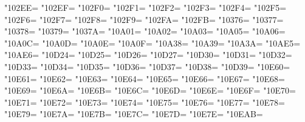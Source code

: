 \XeTeXcharclass"102EE=\KclassNum
\XeTeXcharclass"102EF=\KclassNum
\XeTeXcharclass"102F0=\KclassNum
\XeTeXcharclass"102F1=\KclassNum
\XeTeXcharclass"102F2=\KclassNum
\XeTeXcharclass"102F3=\KclassNum
\XeTeXcharclass"102F4=\KclassNum
\XeTeXcharclass"102F5=\KclassNum
\XeTeXcharclass"102F6=\KclassNum
\XeTeXcharclass"102F7=\KclassNum
\XeTeXcharclass"102F8=\KclassNum
\XeTeXcharclass"102F9=\KclassNum
\XeTeXcharclass"102FA=\KclassNum
\XeTeXcharclass"102FB=\KclassNum
\XeTeXcharclass"10376=\KclassNum
\XeTeXcharclass"10377=\KclassNum
\XeTeXcharclass"10378=\KclassNum
\XeTeXcharclass"10379=\KclassNum
\XeTeXcharclass"1037A=\KclassNum
\XeTeXcharclass"10A01=\KclassNum
\XeTeXcharclass"10A02=\KclassNum
\XeTeXcharclass"10A03=\KclassNum
\XeTeXcharclass"10A05=\KclassNum
\XeTeXcharclass"10A06=\KclassNum
\XeTeXcharclass"10A0C=\KclassNum
\XeTeXcharclass"10A0D=\KclassNum
\XeTeXcharclass"10A0E=\KclassNum
\XeTeXcharclass"10A0F=\KclassNum
\XeTeXcharclass"10A38=\KclassNum
\XeTeXcharclass"10A39=\KclassNum
\XeTeXcharclass"10A3A=\KclassNum
\XeTeXcharclass"10AE5=\KclassNum
\XeTeXcharclass"10AE6=\KclassNum
\XeTeXcharclass"10D24=\KclassNum
\XeTeXcharclass"10D25=\KclassNum
\XeTeXcharclass"10D26=\KclassNum
\XeTeXcharclass"10D27=\KclassNum
\XeTeXcharclass"10D30=\KclassNum
\XeTeXcharclass"10D31=\KclassNum
\XeTeXcharclass"10D32=\KclassNum
\XeTeXcharclass"10D33=\KclassNum
\XeTeXcharclass"10D34=\KclassNum
\XeTeXcharclass"10D35=\KclassNum
\XeTeXcharclass"10D36=\KclassNum
\XeTeXcharclass"10D37=\KclassNum
\XeTeXcharclass"10D38=\KclassNum
\XeTeXcharclass"10D39=\KclassNum
\XeTeXcharclass"10E60=\KclassNum
\XeTeXcharclass"10E61=\KclassNum
\XeTeXcharclass"10E62=\KclassNum
\XeTeXcharclass"10E63=\KclassNum
\XeTeXcharclass"10E64=\KclassNum
\XeTeXcharclass"10E65=\KclassNum
\XeTeXcharclass"10E66=\KclassNum
\XeTeXcharclass"10E67=\KclassNum
\XeTeXcharclass"10E68=\KclassNum
\XeTeXcharclass"10E69=\KclassNum
\XeTeXcharclass"10E6A=\KclassNum
\XeTeXcharclass"10E6B=\KclassNum
\XeTeXcharclass"10E6C=\KclassNum
\XeTeXcharclass"10E6D=\KclassNum
\XeTeXcharclass"10E6E=\KclassNum
\XeTeXcharclass"10E6F=\KclassNum
\XeTeXcharclass"10E70=\KclassNum
\XeTeXcharclass"10E71=\KclassNum
\XeTeXcharclass"10E72=\KclassNum
\XeTeXcharclass"10E73=\KclassNum
\XeTeXcharclass"10E74=\KclassNum
\XeTeXcharclass"10E75=\KclassNum
\XeTeXcharclass"10E76=\KclassNum
\XeTeXcharclass"10E77=\KclassNum
\XeTeXcharclass"10E78=\KclassNum
\XeTeXcharclass"10E79=\KclassNum
\XeTeXcharclass"10E7A=\KclassNum
\XeTeXcharclass"10E7B=\KclassNum
\XeTeXcharclass"10E7C=\KclassNum
\XeTeXcharclass"10E7D=\KclassNum
\XeTeXcharclass"10E7E=\KclassNum
\XeTeXcharclass"10EAB=\KclassNum
